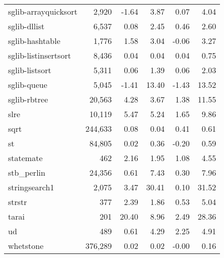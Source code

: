 \begin{table}[ptb]
{\begin{tabular}{@{}lrrrrr@{}}
sglib-arrayquicksort & 2,920 & -1.64 & 3.87 & 0.07 & 4.04 \\
sglib-dllist & 6,537 & 0.08 & 2.45 & 0.46 & 2.60 \\
sglib-hashtable & 1,776 & 1.58 & 3.04 & -0.06 & 3.27 \\
sglib-listinsertsort & 8,436 & 0.04 & 0.04 & 0.04 & 0.75 \\
sglib-listsort & 5,311 & 0.06 & 1.39 & 0.06 & 2.03 \\
sglib-queue & 5,045 & -1.41 & 13.40 & -1.43 & 13.52 \\
sglib-rbtree & 20,563 & 4.28 & 3.67 & 1.38 & 11.55 \\
slre & 10,119 & 5.47 & 5.24 & 1.65 & 9.86 \\
sqrt & 244,633 & 0.08 & 0.04 & 0.41 & 0.61 \\
st & 84,805 & 0.02 & 0.36 & -0.20 & 0.59 \\
statemate & 462 & 2.16 & 1.95 & 1.08 & 4.55 \\
stb\_perlin & 24,356 & 0.61 & 7.43 & 0.30 & 7.96 \\
stringsearch1 & 2,075 & 3.47 & 30.41 & 0.10 & 31.52 \\
strstr & 377 & 2.39 & 1.86 & 0.53 & 5.04 \\
tarai & 201 & 20.40 & 8.96 & 2.49 & 28.36 \\
ud & 489 & 0.61 & 4.29 & 2.25 & 4.91 \\
whetstone & 376,289 & 0.02 & 0.02 & -0.00 & 0.16 \\
\bottomrule
\end{tabular}
}
\label{table:perf}
\end{table}
